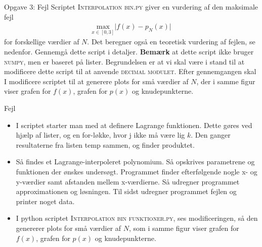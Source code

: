 \begin{frame}{Opgave 3: Fejl}
    Scriptet \textsc{Interpolation bin.py} giver en vurdering af den maksimale fejl 
    \begin{align*}
    \underset{x \in \left [0,3 \right ]}{\text{max}} \lvert f(x)-p_N(x) \rvert
    \end{align*}
    for forskellige værdier af $N$. Det beregner også en teoretisk vurdering af fejlen, se nedenfor. Gennemgå dette script i detaljer. \textbf{Bemærk} at dette script ikke bruger \textsc{numpy}, men er baseret på lister. Begrundelsen er at vi skal være i stand til at modificere dette script til at anvende \textsc{decimal modulet}. Efter gennemgangen skal I modificere scriptet til at generere plots for små værdier af $N$, der i samme figur viser grafen for $f(x)$, grafen for $p(x)$ og knudepunkterne.
\end{frame}

\begin{frame}{Fejl}
    \begin{itemize}
        \item I scriptet starter man med at definere Lagrange funktionen. 
        Dette gøres ved hjælp af lister, og en for-løkke, hvor j ikke må være lig $k$. 
        Den ganger resultaterne fra listen temp sammen, og finder produktet.
    
        \item Så findes et Lagrange-interpoleret polynomium. 
        Så opskrives parametrene og funktionen der ønskes undersøgt. 
        Programmet finder efterfølgende nogle x- og y-værdier samt afstanden mellem x-værdierne. 
        Så udregner programmet approximationen og løsningen. 
        Til sidst udregner programmet fejlen og printer noget data. 
    
        \item I python scriptet \textsc{Interpolation bin funktioner.py}, ses modificeringen, så den genererer plots for små værdier af $N$, som i samme figur viser grafen for $f(x)$, grafen for $p(x)$ og knudepunkterne. 
    \end{itemize}
\end{frame}

